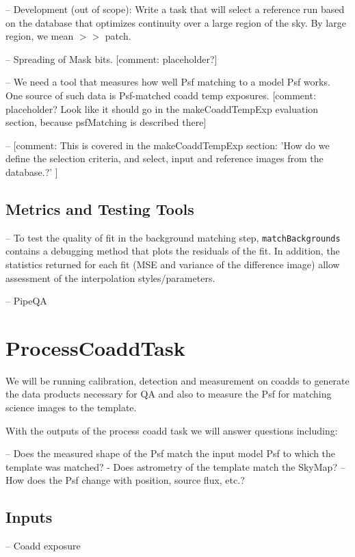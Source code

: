 \documentclass[prd, nofootinbib, floatfix, 11pt,tightenlines,times]{article}
\newcommand{\comment}[1]{{\color{cyan} [{comment: #1}]}}
\begin{document}
-- Development (out of scope): Write a task that will select a reference run based on the database that optimizes continuity over a large region of the sky. By large region, we mean $>>$ patch. 

-- Spreading of Mask bits.  \comment{placeholder?}

-- We need a tool that measures how well Psf matching to a model Psf
works. One source of such data is Psf-matched coadd temp exposures. \comment{placeholder? Look like it should go in the makeCoaddTempExp evaluation section, because psfMatching is described there}

-- \comment{This is covered in the makeCoaddTempExp section:  'How do we define the selection criteria, and select, input and reference images from the database.?' }

\subsection{Metrics and Testing Tools}

-- To test the quality of fit in the background matching step, {\tt matchBackgrounds} contains a debugging method that plots the residuals of the fit.  In addition, the statistics returned for each fit (MSE and variance of the difference image) allow assessment of the interpolation styles/parameters.

-- PipeQA


\clearpage 
\section{ProcessCoaddTask} 
We will be running calibration, detection and measurement on coadds to 
generate the data products necessary for QA and also to measure the Psf
for matching science images to the template.

With the outputs of the process coadd task we will answer questions including:

-- Does the measured shape of the Psf match the input model Psf to which the template was matched?
- Does astrometry of the template match the SkyMap?
-- How does the Psf change with position, source flux, etc.?

\subsection{Inputs}

-- Coadd exposure
\end{document}
